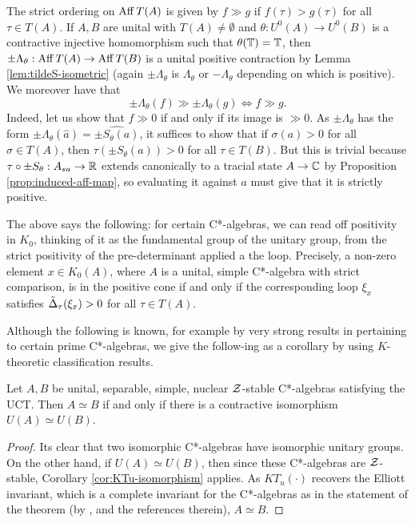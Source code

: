 \documentclass[12pt]{amsart}
\begin{document}
\begin{remark}\label{rem:strict-order}
The strict ordering on $\operatorname{Aff} T(A)$ is given by $f \gg g$ if $f(\tau) > g(\tau)$ for all $\tau \in T(A)$. If $A,B$ are unital with $T(A) \neq \emptyset$ and $\theta:U^0(A) \to U^0(B)$ is a contractive injective homomorphism such that $\theta(\mathbb{T}) = \mathbb{T}$, then $\pm \Lambda_\theta: \operatorname{Aff} T(A) \to \operatorname{Aff} T(B)$ is a unital positive contraction by Lemma \ref{lem:tildeS-isometric} (again $\pm \Lambda_\theta$ is $\Lambda_\theta$ or $-\Lambda_\theta$ depending on which is positive). We moreover have that
\begin{equation}
\pm \Lambda_\theta(f) \gg \pm \Lambda_\theta(g) \iff f \gg g.
\end{equation}
Indeed, let us show that $f \gg 0$ if and only if its image is $\gg 0$. As $\pm \Lambda_\theta$ has the form $\pm \Lambda_\theta(\hat{a}) = \widehat{\pm S_\theta(a)}$, it suffices to show that if $\sigma(a) > 0$ for all $\sigma \in T(A)$, then $\tau(\pm S_\theta (a)) > 0$ for all $\tau \in T(B)$.
But this is trivial because $\tau \circ \pm S_{\theta}: A_{sa} \to \mathbb{R}$ extends canonically to a tracial state $A \to \mathbb{C}$ by Proposition \ref{prop:induced-aff-map}, so evaluating it against $a$ must give that it is strictly positive. 
\end{remark}

The above says the following: for certain C*-algebras, we can read off positivity in $K_0$, thinking of it as the fundamental group of the unitary group, from the strict positivity of the pre-determinant applied a the loop. Precisely, a non-zero element $x \in K_0(A)$, where $A$ is a unital, simple C*-algebra with strict comparison, is in the positive cone if and only if the corresponding loop $\xi_x$ satisfies $\tilde{\Delta}_\tau(\xi_x) > 0$ for all $\tau \in T(A)$.

Although the following is known, for example by very strong results in \cite[Chapter 6]{AraMathieubook} pertaining to certain prime C*-algebras, we give the follow\hyp{}ing as a corollary by using $K$-theoretic classification results. 

\begin{cor}
Let $A,B$ be unital, separable, simple, nuclear $\mathcal{Z}$-stable C*-algebras satisfying the UCT. Then $A \simeq B$ if and only if there is a contractive isomorphism $U(A) \simeq U(B)$.
\begin{proof}
Its clear that two isomorphic C*-algebras have isomorphic unitary groups. On the other hand, if $U(A) \simeq U(B)$, then since these C*-algebras are $\mathcal{Z}$-stable, Corollary \ref{cor:KTu-isomorphism} applies. As $KT_u(\cdot)$ recovers the Elliott invariant, which is a complete invariant for the C*-algebras as in the statement of the theorem (by \cite[Corollary D]{CETWW21}, \cite{EGLN15,GongLinNiu20I,GongLinNiu20II} and the references therein), $A \simeq B$.
\end{proof}
\end{cor}
\end{document}
